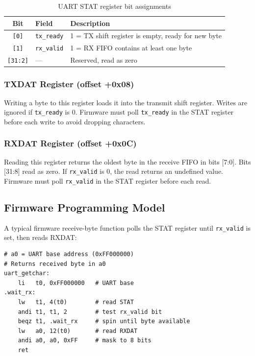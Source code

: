 \begin{table}[H]
  \centering
  \caption{UART STAT register bit assignments}
  \label{tab:uart-stat}
  \begin{tabular}{@{}cll@{}}
    \toprule
    \textbf{Bit} & \textbf{Field} & \textbf{Description} \\
    \midrule
    \texttt{[0]} & \texttt{tx\_ready} & 1 = TX shift register is empty, ready for new byte \\
    \texttt{[1]} & \texttt{rx\_valid} & 1 = RX FIFO contains at least one byte \\
    \texttt{[31:2]} & ---            & Reserved, read as zero \\
    \bottomrule
  \end{tabular}
\end{table}

\subsubsection{TXDAT Register (offset +0x08)}

Writing a byte to this register loads it into the transmit shift register. Writes are
ignored if \texttt{tx\_ready} is 0. Firmware must poll \texttt{tx\_ready} in the STAT
register before each write to avoid dropping characters.

\subsubsection{RXDAT Register (offset +0x0C)}

Reading this register returns the oldest byte in the receive FIFO in bits [7:0].
Bits [31:8] read as zero. If \texttt{rx\_valid} is 0, the read returns an undefined
value. Firmware must poll \texttt{rx\_valid} in the STAT register before each read.

\subsection{Firmware Programming Model}

A typical firmware receive-byte function polls the STAT register until \texttt{rx\_valid}
is set, then reads RXDAT:

\begin{lstlisting}[language=RISCV, caption={UART receive byte (polling)}]
# a0 = UART base address (0xFF000000)
# Returns received byte in a0
uart_getchar:
    li   t0, 0xFF000000   # UART base
.wait_rx:
    lw   t1, 4(t0)        # read STAT
    andi t1, t1, 2        # test rx_valid bit
    beqz t1, .wait_rx     # spin until byte available
    lw   a0, 12(t0)       # read RXDAT
    andi a0, a0, 0xFF     # mask to 8 bits
    ret
\end{lstlisting}


